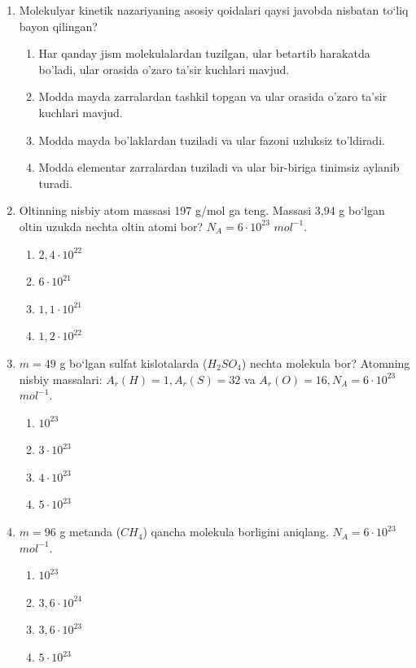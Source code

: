 \begin{enumerate}
\item Molekulyar kinetik nazariyaning asosiy qoidalari qaysi javobda nisbatan to‘liq bayon qilingan?
\begin{enumerate}[label=\Alph*)]
\item Har qanday jism molekulalardan tuzilgan, ular betartib harakatda bo'ladi, ular orasida o'zaro ta'sir kuchlari mavjud.
\item Modda mayda zarralardan tashkil topgan va ular orasida o'zaro ta'sir kuchlari mavjud.
\item Modda mayda bo'laklardan tuziladi va ular fazoni uzluksiz to'ldiradi.
\item Modda elementar zarralardan tuziladi va ular bir-biriga tinimsiz aylanib turadi.
\end{enumerate}

\item Oltinning nisbiy atom massasi 197 g/mol ga teng. Massasi 3,94 g bo‘lgan oltin uzukda nechta oltin atomi bor? $N_A = 6 \cdot 10^{23}$ $mol^{-1}$.
\begin{enumerate}[label=\Alph*)]
\item $2,4 \cdot 10^{22}$
\item $6 \cdot 10^{21}$
\item $1,1 \cdot 10^{21}$
\item $1,2 \cdot 10^{22}$
\end{enumerate}

\item $m = 49$ g bo‘lgan sulfat kislotalarda ($H_2SO_4$) nechta molekula bor? Atomning nisbiy massalari: $A_r(H)=1, A_r(S)=32$ va $A_r(O)=16, N_A = 6 \cdot 10^{23}$ $mol^{-1}$.
\begin{enumerate}[label=\Alph*)]
\item $10^{23}$
\item $3 \cdot 10^{23}$
\item $4 \cdot 10^{23}$
\item $5 \cdot 10^{23}$
\end{enumerate}

\item $m = 96$ g metanda ($CH_4$) qancha molekula borligini aniqlang. $N_A = 6 \cdot 10^{23}$ $mol^{-1}$.
\begin{enumerate}[label=\Alph*)]
\item $10^{23}$
\item $3,6 \cdot 10^{24}$
\item $3,6 \cdot 10^{23}$
\item $5 \cdot 10^{23}$
\end{enumerate}


\end{enumerate}

